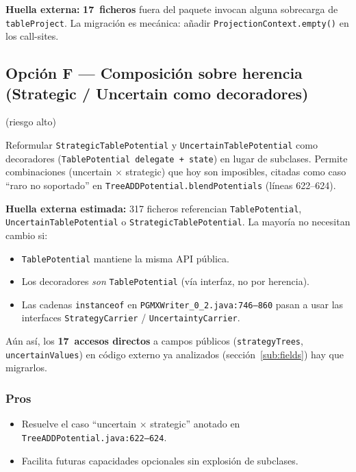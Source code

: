 \documentclass[11pt,a4paper]{article}
\newcommand{\code}[1]{\texttt{#1}}
\begin{document}
\textbf{Huella externa:} \textbf{17~ficheros} fuera del paquete invocan
alguna sobrecarga de \code{tableProject}. La migración es mecánica: añadir
\code{ProjectionContext.empty()} en los call-sites.

\subsection{Opción F --- Composición sobre herencia (Strategic / Uncertain
como decoradores)} (riesgo alto)

Reformular \code{StrategicTablePotential} y \code{UncertainTablePotential}
como decoradores (\code{TablePotential delegate + state}) en lugar de
subclases. Permite combinaciones (uncertain $\times$ strategic) que hoy son
imposibles, citadas como caso ``raro no soportado'' en
\code{TreeADDPotential.blendPotentials} (líneas 622--624).

\textbf{Huella externa estimada:} 317 ficheros referencian
\code{TablePotential}, \code{Uncertain\-Table\-Potential} o
\code{Strategic\-Table\-Potential}. La mayoría no necesitan cambio si:

\begin{itemize}[leftmargin=*]
  \item \code{TablePotential} mantiene la misma API pública.
  \item Los decoradores \emph{son} \code{TablePotential} (vía interfaz, no por
        herencia).
  \item Las cadenas \code{instanceof} en
        \code{PGMXWriter\_0\_2.java:746--860} pasan a usar las interfaces
        \code{StrategyCarrier} / \code{UncertaintyCarrier}.
\end{itemize}

Aún así, los \textbf{17~accesos directos} a campos públicos
(\code{strategyTrees}, \code{uncertainValues}) en código externo ya analizados
(sección~\ref{sub:fields}) hay que migrarlos.

\subsubsection*{Pros}
\begin{itemize}[leftmargin=*]
  \item Resuelve el caso ``uncertain $\times$ strategic'' anotado en
        \code{TreeADDPotential.java:622--624}.
  \item Facilita futuras capacidades opcionales sin explosión de subclases.
\end{itemize}
\end{document}
